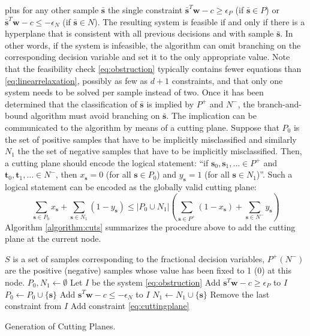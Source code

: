 \documentclass[11pt]{article}
\theoremstyle{definition}
\newcommand{\vect}[1]{\mathbf{#1}}
\newcommand{\sv}[1]{_{\vect{#1}}}
\begin{document}
plus for any other sample $\bar{\vect{s}}$ the single constraint 
$\bar{\vect{s}}^T \vect{w} - c \geq \epsilon_P$ (if $\bar{\vect{s}} \in P$)
or 
$\bar{\vect{s}}^T \vect{w} - c \leq - \epsilon_N$ (if $\bar{\vect{s}} \in N$).
The resulting system is feasible if and only if there is 
a hyperplane that is consistent with all previous decisions
and with sample $\bar{\vect{s}}$.
In other words, if the system is infeasible,
the algorithm can omit branching on the corresponding decision variable
and set it to the only appropriate value.
Note that the feasibility check \eqref{eq:obstruction}
typically contains fewer equations 
than \eqref{eq:linearrelaxation}, possibly as few as $d + 1$ constraints,
and that only one system needs to be solved per sample instead of two.
Once it has been determined that the classification of $\bar{\vect{s}}$ 
is implied by $P^+$ and $N^-$, 
the branch-and-bound algorithm must avoid branching on $\bar{\vect{s}}$.
The implication can be communicated to the algorithm by means of 
a cutting plane. 
Suppose that $P_0$ is the set of positive samples that have to be implicitly 
misclassified and similarly 
$N_1$ the the set of negative samples that have to be implicitly misclassified.
Then, a cutting plane should encode the logical statement:
``if $\vect{s}_0, \vect{s}_1 , \dots \in P^+$ and
$\vect{t}_0, \vect{t}_1 , \dots \in N^-$, then
$x\sv{s} = 0$ (for all $\vect{s} \in P_0$) and
$y\sv{s} = 1$ (for all $\vect{s} \in N_1$)''. 
Such a logical statement can be encoded as the globally valid cutting plane:
\begin{equation}
\label{eq:cuttingplane}
\sum_{\vect{s} \in P_0} x\sv{s} + \sum_{\vect{s} \in N_1} (1 - y\sv{s}) 
\leq
|P_0 \cup N_1| 
\left( 
\sum_{\vect{s} \in P^+} (1 - x\sv{s}) + \sum_{\vect{s} \in N^-} y\sv{s} 
\right)
\end{equation}
Algorithm \ref{algorithm:cuts} summarizes the procedure above
to add the cutting plane at the current node.
\begin{algorithm}
\begin{algorithmic}
\REQUIRE $S$ is a set of samples corresponding to the fractional decision variables, 
$P^+ (N^-)$ are the positive (negative) samples whose value has
been fixed to 1 (0) at this node.
\RETURN 
\ENDIF
\STATE $P_0, N_1 \leftarrow \emptyset$
\STATE Let $I$ be the system \eqref{eq:obstruction} 
\FORALL{$\vect{s} \in S$}
\IF{$\vect{s} \in P$}
\STATE Add $\vect{s}^T \vect{w} - c \geq \epsilon_P$ to $I$
\STATE $P_0 \leftarrow P_0 \cup \{ \vect{s} \}$
\ENDIF
\ELSE
\STATE Add $\vect{s}^T \vect{w} - c \leq - \epsilon_N$ to $I$
\STATE $N_1 \leftarrow N_1 \cup \{ \vect{s} \}$
\ENDIF
\ENDIF
\STATE Remove the last constraint from $I$
\ENDFOR
\STATE Add constraint \eqref{eq:cuttingplane}
\end{algorithmic}
\caption{Generation of Cutting Planes.}
\label{algorithm:cuts}
\end{algorithm}
\end{document}
